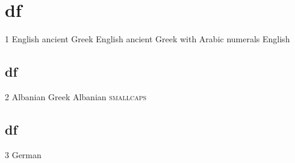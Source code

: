 \documentclass{article}
\begin{document}
\part{df}

1 English \textgreek[variant=ancient]{ancient Greek} English
\textgreek[numerals=arabic, variant=ancient]{ancient Greek with Arabic numerals} English

\begin{albanian}%

\part{df}

2 Albanian \textgreek{Greek} Albanian \textsc{smallcaps}

\end{albanian}%
\begin{german}%

\part{df}

3 German

\end{german}%

\begin{albanian}%
\end{albanian}%
\end{document}
